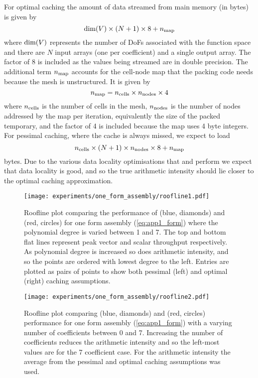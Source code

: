 \documentclass[thesis]{subfiles}
\begin{document}
For optimal caching the amount of data streamed from main memory (in bytes) is given by
\begin{equation}
  \textnormal{dim}(V) \times (N + 1) \times 8 + n_{\textnormal{map}}
\end{equation}
where $\textnormal{dim}(V)$ represents the number of DoFs associated with the function space and there are $N$ input arrays (one per coefficient) and a single output array.
The factor of 8 is included as the values being streamed are in double precision.
The additional term $n_{\textnormal{map}}$ accounts for the cell-node map that the packing code needs because the mesh is unstructured.
It is given by
\begin{equation}
  n_{\textnormal{map}} = n_{\textnormal{cells}} \times n_{\textnormal{nodes}} \times 4
\end{equation}
where $n_{\textnormal{cells}}$ is the number of cells in the mesh, $n_{\textnormal{nodes}}$ is the number of nodes addressed by the map per iteration, equivalently the size of the packed temporary, and the factor of 4 is included because the map uses 4 byte integers.
For pessimal caching, where the cache is always missed, we expect to load
\begin{equation}
  n_{\textnormal{cells}} \times (N + 1) \times n_{\textnormal{nodes}} \times 8 + n_{\textnormal{map}}
\end{equation}
bytes.
Due to the various data locality optimisations that  and  perform we expect that data locality is good, and so the true arithmetic intensity should lie closer to the optimal caching approximation.

\begin{figure}
  \centering
  \texttt{[image: experiments/one\_form\_assembly/roofline1.pdf]}
  \caption{
    Roofline plot comparing the performance of  (blue, diamonds) and  (red, circles) for one form assembly (\cref{eq:app1_form}) where the polynomial degree is varied between 1 and 7.
    The top and bottom flat lines represent peak vector and scalar throughput respectively.
    As polynomial degree is increased so does arithmetic intensity, and so the points are ordered with lowest degree to the left.
    Entries are plotted as pairs of points to show both pessimal (left) and optimal (right) caching assumptions.
  }
  \label{fig:app1_roofline1}
\end{figure}

\begin{figure}
  \centering
  \texttt{[image: experiments/one\_form\_assembly/roofline2.pdf]}
  \caption{
    Roofline plot comparing  (blue, diamonds) and  (red, circles) performance for one form assembly (\cref{eq:app1_form}) with a varying number of coefficients between 0 and 7.
    Increasing the number of coefficients reduces the arithmetic intensity and so the left-most values are for the 7 coefficient case.
    For the arithmetic intensity the average from the pessimal and optimal caching assumptions was used.
  }
  \label{fig:app1_roofline2}
\end{figure}
\end{document}
